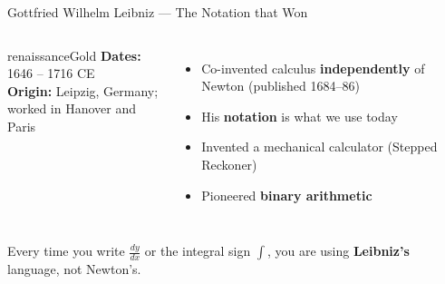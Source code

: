 \begin{frame}[shrink=17]{Gottfried Wilhelm Leibniz --- The Notation that Won}
  \begin{columns}[T]
    \begin{personbox}[G.\ W.\ Leibniz]{renaissanceGold}
      \textbf{Dates:} 1646 -- 1716 CE\\
      \textbf{Origin:} Leipzig, Germany;\\worked in Hanover and Paris
    \end{personbox}
    \vspace{0.3em}
    \begin{itemize}
      \item Co-invented calculus \textbf{independently} of Newton (published 1684--86)
      \item His \textbf{notation} is what we use today
      \item Invented a mechanical calculator (Stepped Reckoner)
      \item Pioneered \textbf{binary arithmetic}
    \end{itemize}

  \end{columns}

  \vspace{0.2em}
  \begin{insightbox}
    {\footnotesize Every time you write $\frac{dy}{dx}$ or the integral sign $\int$, you are using \textbf{Leibniz's} language, not Newton's.}
  \end{insightbox}

\end{frame}

